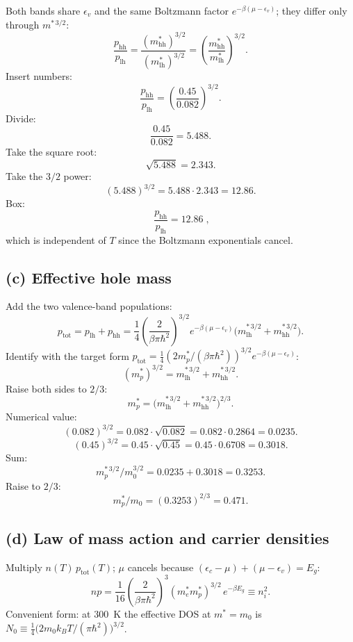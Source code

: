 \documentclass[11pt]{article}
\begin{document}
Both bands share $\epsilon_v$ and the same Boltzmann factor $e^{-\beta(\mu-\epsilon_v)}$; they differ only through $m^{*\,3/2}$:
\[
\frac{p_\text{hh}}{p_\text{lh}} = \frac{(m_\text{hh}^*)^{3/2}}{(m_\text{lh}^*)^{3/2}} = \left(\frac{m_\text{hh}^*}{m_\text{lh}^*}\right)^{\!3/2}.
\]
Insert numbers:
\[
\frac{p_\text{hh}}{p_\text{lh}} = \left(\frac{0.45}{0.082}\right)^{3/2}.
\]
Divide:
\[
\frac{0.45}{0.082} = 5.488.
\]
Take the square root:
\[
\sqrt{5.488} = 2.343.
\]
Take the $3/2$ power:
\[
(5.488)^{3/2} = 5.488\cdot 2.343 = 12.86.
\]
Box:
\[
\boxed{\;\frac{p_\text{hh}}{p_\text{lh}} = 12.86\;,}
\]
which is independent of $T$ since the Boltzmann exponentials cancel.

\subsection*{(c) Effective hole mass}

Add the two valence-band populations:
\[
p_\text{tot} = p_\text{lh} + p_\text{hh} = \frac{1}{4}\!\left(\frac{2}{\beta\pi\hbar^2}\right)^{\!3/2}\!\!e^{-\beta(\mu-\epsilon_v)}\bigl(m_\text{lh}^{*\,3/2} + m_\text{hh}^{*\,3/2}\bigr).
\]
Identify with the target form $p_\text{tot} = \tfrac14(2m_p^*/(\beta\pi\hbar^2))^{3/2} e^{-\beta(\mu-\epsilon_v)}$:
\[
(m_p^*)^{3/2} = m_\text{lh}^{*\,3/2} + m_\text{hh}^{*\,3/2}.
\]
Raise both sides to $2/3$:
\[
\boxed{\;m_p^* = \bigl(m_\text{lh}^{*\,3/2} + m_\text{hh}^{*\,3/2}\bigr)^{2/3}.\;}
\]
Numerical value:
\[
(0.082)^{3/2} = 0.082\cdot\sqrt{0.082} = 0.082\cdot 0.2864 = 0.0235.
\]
\[
(0.45)^{3/2} = 0.45\cdot\sqrt{0.45} = 0.45\cdot 0.6708 = 0.3018.
\]
Sum:
\[
m_p^{*\,3/2}/m_0^{3/2} = 0.0235 + 0.3018 = 0.3253.
\]
Raise to $2/3$:
\[
m_p^*/m_0 = (0.3253)^{2/3} = 0.471.
\]

\subsection*{(d) Law of mass action and carrier densities}

Multiply $n(T)\,p_\text{tot}(T)$; $\mu$ cancels because $(\epsilon_c-\mu)+(\mu-\epsilon_v) = E_g$:
\begin{equation}
\boxed{\;n p = \frac{1}{16}\!\left(\frac{2}{\beta\pi\hbar^2}\right)^{\!3}\!(m_e^* m_p^*)^{3/2}\,e^{-\beta E_g} \equiv n_i^2.\;}
\label{eq:mass-action}
\end{equation}
Convenient form: at \SI{300}{K} the effective DOS at $m^* = m_0$ is $N_0 \equiv \tfrac14\bigl(2 m_0 k_B T/(\pi\hbar^2)\bigr)^{3/2}$.
\end{document}
